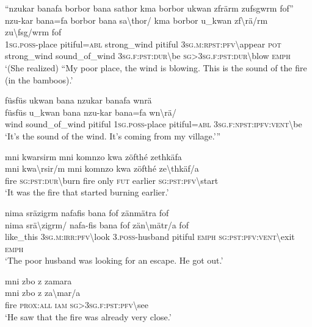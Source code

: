 \ea\label{ex:7:a4822}
``nzukar banafa borbor bana sathor kma borbor ukwan zfrärm zufsgwrm fof''\\
\gll nzu-kar	bana=fa	borbor	bana	sa{\textbackslash}thor/	kma	borbor	u\_kwan	zf{\textbackslash}rä/rm	zu{\textbackslash}fsg/wrm	fof\\
     1\textsc{sg}.\textsc{poss}-place	pitiful=\textsc{abl}	strong\_wind	pitiful	3\textsc{sg}.\textsc{m}:\textsc{rpst}:\textsc{pfv}{\textbackslash}appear	\textsc{pot}	strong\_wind	sound\_of\_wind	3\textsc{sg}.\textsc{f}:\textsc{pst}:\textsc{dur}{\textbackslash}be	\textsc{sg}>3\textsc{sg}.\textsc{f}:\textsc{pst}:\textsc{dur}{\textbackslash}blow	\textsc{emph}\\
\glt `(She realized) ``My poor place, the wind is blowing. This is the sound of the fire (in the bamboos).'
\z

\newpage
\ea\label{ex:7:a4824}
füsfüs ukwan bana nzukar banafa wnrä\\
\gll füsfüs	u\_kwan	bana	nzu-kar	bana=fa	wn{\textbackslash}rä/\\
     wind	sound\_of\_wind	pitiful	1\textsc{sg}.\textsc{poss}-place	pitiful=\textsc{abl}	3\textsc{sg}.\textsc{f}:\textsc{npst}:\textsc{ipfv}:\textsc{vent}{\textbackslash}be\\
\glt `It's the sound of the wind. It's coming from my village.'''
\z

\ea\label{ex:7:a4825}
mni kwarsirm mni komnzo kwa zöfthé zethkäfa\\
\gll mni	kwa{\textbackslash}rsir/m	mni	komnzo	kwa	zöfthé	ze{\textbackslash}thkäf/a\\
     fire	\textsc{sg}:\textsc{pst}:\textsc{dur}{\textbackslash}burn	fire	only	\textsc{fut}	earlier	\textsc{sg}:\textsc{pst}:\textsc{pfv}{\textbackslash}start\\
\glt `It was the fire that started burning earlier.'
\z

\ea\label{ex:7:a4826}
nima sräzigrm nafafis bana fof zänmätra fof\\
\gll nima	srä{\textbackslash}zigrm/	nafa-fis	bana	fof	zän{\textbackslash}mätr/a	fof\\
     like\_this	3\textsc{sg}.\textsc{m}:\textsc{irr}:\textsc{pfv}{\textbackslash}look	3.\textsc{poss}-husband	pitiful	\textsc{emph}	\textsc{sg}:\textsc{pst}:\textsc{pfv}:\textsc{vent}{\textbackslash}exit	\textsc{emph}\\
\glt `The poor husband was looking for an escape. He got out.'
\z

\ea\label{ex:7:a4827}
mni zbo z zamara\\
\gll mni	zbo	z	za{\textbackslash}mar/a\\
     fire	\textsc{prox}:\textsc{all}	\textsc{iam}	\textsc{sg}>3\textsc{sg}.\textsc{f}:\textsc{pst}:\textsc{pfv}{\textbackslash}see\\
\glt `He saw that the fire was already very close.'
\z

